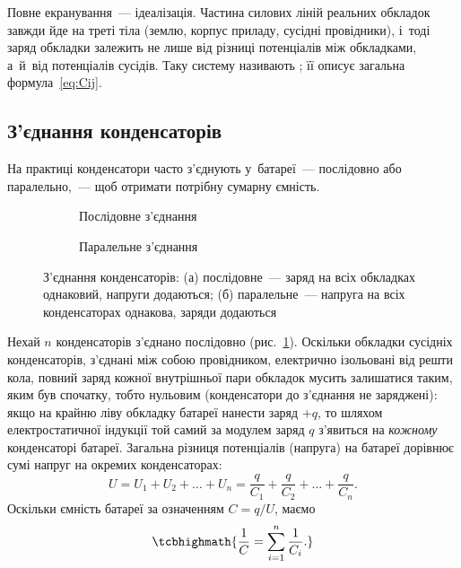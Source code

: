 Повне екранування~--- ідеалізація. Частина силових ліній реальних обкладок завжди йде на
треті тіла (землю, корпус приладу, сусідні провідники), і~тоді заряд обкладки залежить не
лише від різниці потенціалів між обкладками, а~й~від потенціалів сусідів. Таку систему
називають ; її описує загальна
формула~\eqref{eq:Cij}.


\subsection*{З'єднання конденсаторів}


На практиці конденсатори часто з'єднують у~батареї~--- послідовно або паралельно,~--- щоб
отримати потрібну сумарну ємність.

\begin{figure}[h!]
	\centering
	\begin{subfigure}[t]{0.48\linewidth}
		\centering
		\caption{Послідовне з'єднання}
		\label{pic:CapacitorsSeries}
	\end{subfigure}\hfill
	\begin{subfigure}[t]{0.48\linewidth}
		\centering
		\caption{Паралельне з'єднання}
		\label{pic:CapacitorsParallel}
	\end{subfigure}
	\caption{З'єднання конденсаторів: (а) послідовне~--- заряд на всіх обкладках
	однаковий, напруги додаються; (б) паралельне~--- напруга на всіх конденсаторах
	однакова, заряди додаються}
	\label{pic:CapacitorsConnection}
\end{figure}

 Нехай $n$ конденсаторів з'єднано послідовно
(рис.~\ref{pic:CapacitorsSeries}). Оскільки обкладки сусідніх конденсаторів, з'єднані між
собою провідником, електрично ізольовані від решти кола, повний заряд кожної внутрішньої
пари обкладок мусить залишатися таким, яким був спочатку, тобто нульовим (конденсатори
до з'єднання не заряджені): якщо на крайню ліву обкладку батареї нанести
заряд $+q$, то шляхом електростатичної індукції той самий за модулем заряд $q$ з'явиться
на \emph{кожному} конденсаторі батареї. Загальна різниця потенціалів (напруга) на батареї
дорівнює сумі напруг на окремих конденсаторах:
\begin{equation*}
	U = U_1 + U_2 + \ldots + U_n = \frac{q}{C_1} + \frac{q}{C_2} + \ldots + \frac{q}{C_n}.
\end{equation*}
Оскільки ємність батареї за означенням $C = q/U$, маємо
\begin{equation}\label{eq:SeriesCap}
	\tcbhighmath{
		\frac1C = \sum\limits_{i=1}^n \frac1{C_i}.
	}
\end{equation}


